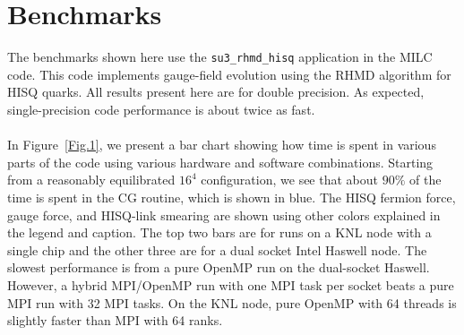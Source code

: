 \documentclass[epj]{webofc}
\begin{document}
\section{Benchmarks}\label{sec-1}

The benchmarks shown here use the {\tt su3\_rhmd\_hisq} application in the MILC code.
This code implements gauge-field evolution using the RHMD algorithm for
HISQ quarks.
All results present here are for double precision. 
As expected, single-precision code performance is about twice as fast.\\
\\
In Figure~\ref{Fig.1}, we present a bar chart showing how time is spent in
various parts of the code using various hardware and software combinations.
Starting from a reasonably equilibrated $16^4$ configuration,
we see that about $90\%$ of the time is spent in the CG routine, which is
shown in blue. 
The HISQ fermion force, gauge force, and HISQ-link smearing are shown using
other colors explained in the legend and caption. 
The top two bars are for runs on a KNL node with a single chip and 
the other three are for a dual socket Intel Haswell node.
The slowest performance is from a pure OpenMP run on the dual-socket Haswell.
However, a hybrid MPI/OpenMP run with one MPI task per socket beats
a pure MPI run with 32 MPI tasks.
On the KNL node, pure OpenMP with 64 threads is slightly faster than MPI
with 64 ranks.
\end{document}
